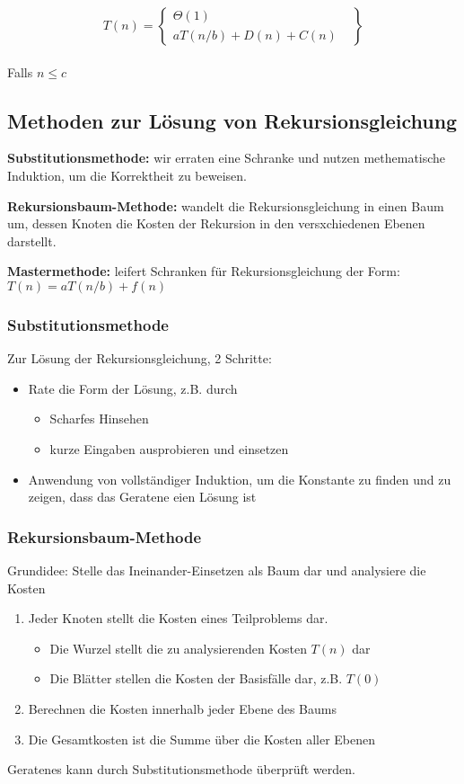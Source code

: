 		\begin{center}
			\[
				T(n) = \left\{\begin{array}{lr}
					\Theta (1) & \\
					aT(n/b) + D(n) + C(n) &
					\end{array}\right\}
			\] \\
			Falls $n \leq c$ \vspace{1cm}
		\end{center}


	\subsection{Methoden zur Lösung von Rekursionsgleichung}
		\noindent \textbf{Substitutionsmethode:} wir erraten eine Schranke und nutzen methematische Induktion, 
		um die Korrektheit zu beweisen.

		\noindent \textbf{Rekursionsbaum-Methode:} wandelt die Rekursionsgleichung in einen Baum um, 
		dessen Knoten die Kosten der Rekursion in den versxchiedenen Ebenen darstellt.

		\noindent \textbf{Mastermethode:} leifert Schranken für Rekursionsgleichung der Form: $T(n) = aT(n/b) + f(n)$


		\subsubsection{Substitutionsmethode}
			Zur Lösung der Rekursionsgleichung, 2 Schritte:
			\begin{itemize}
				\item Rate die Form der Lösung, z.B. durch 
				\begin{itemize}
					\item Scharfes Hinsehen
					\item kurze Eingaben ausprobieren und einsetzen
				\end{itemize}
				\item Anwendung von vollständiger Induktion, um die Konstante zu finden und zu zeigen, dass
				das Geratene eien Lösung ist
			\end{itemize}


		\subsubsection{Rekursionsbaum-Methode}
			Grundidee: Stelle das Ineinander-Einsetzen als Baum dar und analysiere die Kosten
			\begin{enumerate}
				\item Jeder Knoten stellt die Kosten eines Teilproblems dar.
				\begin{itemize}
					\item Die Wurzel stellt die zu analysierenden Kosten $T(n)$ dar
					\item Die Blätter stellen die Kosten der Basisfälle dar, z.B. $T(0)$
				\end{itemize}
				\item Berechnen die Kosten innerhalb jeder Ebene des Baums
				\item Die Gesamtkosten ist die Summe über die Kosten aller Ebenen
			\end{enumerate}
			Geratenes kann durch Substitutionsmethode überprüft werden.



